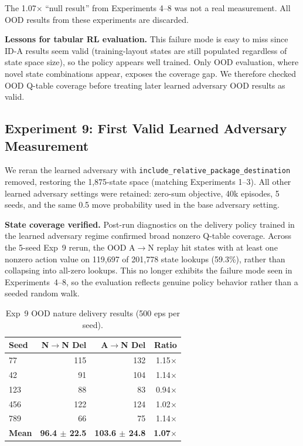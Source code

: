 \documentclass[sigconf]{aamas}
\DeclareRobustCommand{\codepath}[1]{\nolinkurl{#1}}
\begin{document}
The 1.07$\times$ ``null result'' from Experiments 4--8 was not a real measurement. All OOD results from these experiments are discarded.

\textbf{Lessons for tabular RL evaluation.} This failure mode is easy to miss since
ID-A results seem valid (training-layout states are still populated regardless of state
space size), so the policy appears well trained. Only OOD evaluation, where novel
state combinations appear, exposes the coverage gap. We therefore checked OOD
Q-table coverage before treating later learned adversary OOD results as valid.

\subsection{Experiment 9: First Valid Learned Adversary Measurement}
\label{sec:exp9}

We reran the learned adversary with \codepath{include_relative_package_destination}
removed, restoring the 1,875-state space (matching Experiments 1--3). All other
learned adversary settings were retained: zero-sum objective, 40k episodes, 5 seeds,
and the same 0.5 move probability used in the base adversary setting.

\textbf{State coverage verified.} Post-run diagnostics on the delivery policy trained in the learned adversary regime
confirmed broad nonzero Q-table coverage. Across the 5-seed Exp~9 rerun, the
OOD A$\to$N replay hit states with at least one nonzero action value on
119{,}697 of 201{,}778 state lookups (59.3\%), rather than collapsing into
all-zero lookups. This no longer exhibits the failure mode seen in
Experiments~4--8, so the evaluation reflects genuine policy behavior rather than
a seeded random walk.

\begin{table}[H]
\caption{Exp~9 OOD nature delivery results (500 eps per seed).}
\label{tab:exp9}
\centering
\footnotesize
\begin{tabular}{lrrr}
\toprule
\textbf{Seed} & \textbf{N$\to$N Del} & \textbf{A$\to$N Del} & \textbf{Ratio} \\
\midrule
77  & 115 & 132 & 1.15$\times$ \\
42  & 91  & 104 & 1.14$\times$ \\
123 & 88  & 83  & 0.94$\times$ \\
456 & 122 & 124 & 1.02$\times$ \\
789 & 66  & 75  & 1.14$\times$ \\
\midrule
\textbf{Mean} & \textbf{96.4 $\pm$ 22.5} & \textbf{103.6 $\pm$ 24.8} & \textbf{1.07$\times$} \\
\bottomrule
\end{tabular}
\end{table}
\end{document}
